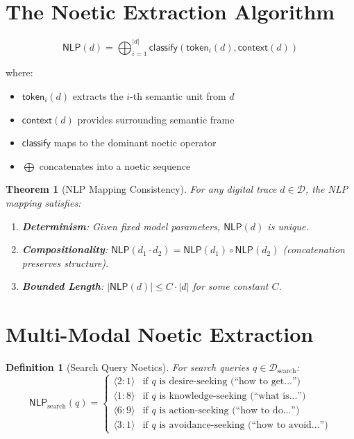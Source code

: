 \documentclass[11pt,twoside]{book}
\newcommand{\NLP}{\mathsf{NLP}}
\newcommand{\DigitalTrace}{\mathcal{D}}
\newtheorem{definition}{Definition}[chapter]
\newtheorem{theorem}{Theorem}[chapter]
\begin{document}
\section{The Noetic Extraction Algorithm}

\begin{equation}
\boxed{
    \NLP(d) = \bigoplus_{i=1}^{|d|} \mathsf{classify}\left( \mathsf{token}_i(d), \mathsf{context}(d) \right)
}
\end{equation}

where:
\begin{itemize}
    \item $\mathsf{token}_i(d)$ extracts the $i$-th semantic unit from $d$
    \item $\mathsf{context}(d)$ provides surrounding semantic frame
    \item $\mathsf{classify}$ maps to the dominant noetic operator
    \item $\bigoplus$ concatenates into a noetic sequence
\end{itemize}

\begin{theorem}[NLP Mapping Consistency]
\label{thm:nlp-consistency}
For any digital trace $d \in \DigitalTrace$, the NLP mapping satisfies:
\begin{enumerate}[label=(\roman*)]
    \item \textbf{Determinism}: Given fixed model parameters, $\NLP(d)$ is unique.
    \item \textbf{Compositionality}: $\NLP(d_1 \cdot d_2) = \NLP(d_1) \circ \NLP(d_2)$ (concatenation preserves structure).
    \item \textbf{Bounded Length}: $|\NLP(d)| \leq C \cdot |d|$ for some constant $C$.
\end{enumerate}
\end{theorem}

\section{Multi-Modal Noetic Extraction}

\begin{definition}[Search Query Noetics]
\label{def:search-noetics}
For search queries $q \in \DigitalTrace_{\text{search}}$:
\[
    \NLP_{\text{search}}(q) =
    \begin{cases}
        \langle 2 : 1 \rangle & \text{if } q \text{ is desire-seeking (``how to get...'')} \\
        \langle 1 : 8 \rangle & \text{if } q \text{ is knowledge-seeking (``what is...'')} \\
        \langle 6 : 9 \rangle & \text{if } q \text{ is action-seeking (``how to do...'')} \\
        \langle 3 : 1 \rangle & \text{if } q \text{ is avoidance-seeking (``how to avoid...'')}
    \end{cases}
\]
\end{definition}
\end{document}
